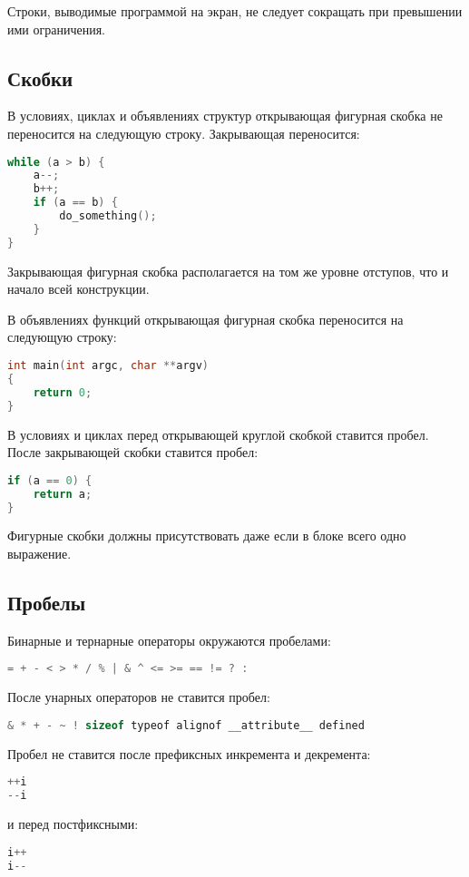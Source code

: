 Строки, выводимые программой на экран, не следует сокращать при превышении ими ограничения.

\subsection*{Скобки}

В условиях, циклах и объявлениях структур открывающая фигурная скобка не переносится на следующую строку. Закрывающая переносится:
\begin{lstlisting}[language=C]
while (a > b) {
    a--;
    b++;
    if (a == b) {
        do_something();
    }
}
\end{lstlisting}

Закрывающая фигурная скобка располагается на том же уровне отступов, что и начало всей конструкции.

\linespace

В объявлениях функций открывающая фигурная скобка переносится на следующую строку:
\begin{lstlisting}[language=C]
int main(int argc, char **argv)
{
    return 0;
}
\end{lstlisting}

В условиях и циклах перед открывающей круглой скобкой ставится пробел. После закрывающей скобки ставится пробел:

\newpage

\begin{lstlisting}[language=C]
if (a == 0) {
    return a;
}
\end{lstlisting}

Фигурные скобки должны присутствовать даже если в блоке всего одно выражение.

\subsection*{Пробелы}

Бинарные и тернарные операторы окружаются пробелами:
\begin{lstlisting}[language=C]
= + - < > * / % | & ^ <= >= == != ? :
\end{lstlisting}

После унарных операторов не ставится пробел:
\begin{lstlisting}[language=C]
& * + - ~ ! sizeof typeof alignof __attribute__ defined
\end{lstlisting}

Пробел не ставится после префиксных инкремента и декремента:
\begin{lstlisting}[language=C]
++i
--i
\end{lstlisting}
и перед постфиксными:
\begin{lstlisting}[language=C]
i++
i--
\end{lstlisting}

